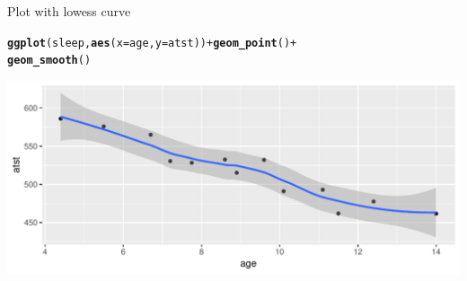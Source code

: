 \documentclass[unknownkeysallowed]{beamer}\usepackage[]{graphicx}\usepackage[]{color}
\makeatletter
\def\maxwidth{ %
  \ifdim\Gin@nat@width>\linewidth
    \linewidth
  \else
    \Gin@nat@width
  \fi
}
\newcommand{\hlopt}[1]{\textcolor[rgb]{0,0,0}{#1}}%
\newcommand{\hlstd}[1]{\textcolor[rgb]{0.345,0.345,0.345}{#1}}%
\newcommand{\hlkwc}[1]{\textcolor[rgb]{0.333,0.667,0.333}{#1}}%
\newcommand{\hlkwd}[1]{\textcolor[rgb]{0.737,0.353,0.396}{\textbf{#1}}}%
\newenvironment{kframe}{%
 \def\at@end@of@kframe{}%
 \ifinner\ifhmode%
  \def\at@end@of@kframe{\end{minipage}}%
  \begin{minipage}{\columnwidth}%
 \fi\fi%
 \def\FrameCommand##1{\hskip\@totalleftmargin \hskip-\fboxsep
 \colorbox{shadecolor}{##1}\hskip-\fboxsep
     \hskip-\linewidth \hskip-\@totalleftmargin \hskip\columnwidth}%
 \MakeFramed {\advance\hsize-\width
   \@totalleftmargin\z@ \linewidth\hsize
   \@setminipage}}%
 {\par\unskip\endMakeFramed%
 \at@end@of@kframe}
\newenvironment{knitrout}{}{} %
\makeatother
\begin{document}
\begin{frame}[fragile]{Plot with lowess curve}
  

\begin{knitrout}
\color{fgcolor}\begin{kframe}
\begin{alltt}
\hlkwd{ggplot}\hlstd{(sleep,}\hlkwd{aes}\hlstd{(}\hlkwc{x}\hlstd{=age,}\hlkwc{y}\hlstd{=atst))}\hlopt{+}\hlkwd{geom_point}\hlstd{()}\hlopt{+}
  \hlkwd{geom_smooth}\hlstd{()}
\end{alltt}


{\ttfamily\noindent\itshape{}}\end{kframe}
\includegraphics[width=\maxwidth]{figure/icko-1} 

\end{knitrout}

  
  
\end{frame}
\end{document}
